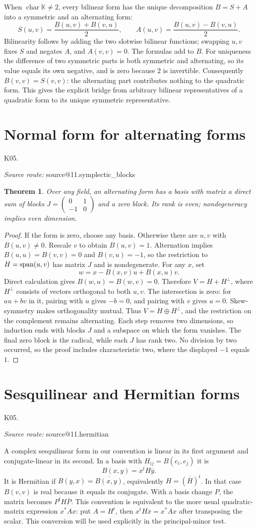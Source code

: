 \documentclass[11pt,a4paper]{book}
\makeatletter
\newtheorem{theorem}{Theorem}[chapter]
\theoremstyle{definition}\newtheorem{definition}[theorem]{Definition}
\theoremstyle{remark}\newtheorem{remark}[theorem]{Remark}
\newcommand{\K}{\mathbb K}\newcommand{\R}{\mathbb R}\newcommand{\C}{\mathbb C}
\newcommand{\Kentry}[2]{\section{#2}\label{k:#1}\noindent\textsf{\small K05.\detokenize{#1}}\par
  \begingroup\small\color{black!65}\textit{Source route: }\csname source@#1\endcsname\par\endgroup}
\makeatother
\begin{document}
When $\operatorname{char}\K\ne2$, every bilinear form has the unique decomposition $B=S+A$ into a symmetric and an alternating form:
\[S(u,v)=\frac{B(u,v)+B(v,u)}2,\qquad
A(u,v)=\frac{B(u,v)-B(v,u)}2.
\]
Bilinearity follows by adding the two slotwise bilinear functions; swapping $u,v$ fixes $S$ and negates $A$, and $A(v,v)=0$. The formulas add to $B$. For uniqueness the difference of two symmetric parts is both symmetric and alternating, so its value equals its own negative, and is zero because $2$ is invertible. Consequently $B(v,v)=S(v,v)$: the alternating part contributes nothing to the quadratic form. This gives the explicit bridge from arbitrary bilinear representatives of a quadratic form to its unique symmetric representative.

\Kentry{11.symplectic_blocks}{Normal form for alternating forms}
\begin{theorem}
Over any field, an alternating form has a basis with matrix a direct sum of blocks $J=\begin{pmatrix}0&1\\-1&0\end{pmatrix}$ and a zero block. Its rank is even; nondegeneracy implies even dimension.
\end{theorem}
\begin{proof}
If the form is zero, choose any basis. Otherwise there are $u,v$ with $B(u,v)\ne0$. Rescale $v$ to obtain $B(u,v)=1$. Alternation implies $B(u,u)=B(v,v)=0$ and $B(v,u)=-1$, so the restriction to $H=\operatorname{span}(u,v)$ has matrix $J$ and is nondegenerate. For any $x$, set
\[w=x-B(x,v)u+B(x,u)v.
\]
Direct calculation gives $B(w,u)=B(w,v)=0$. Therefore $V=H+H^\perp$, where $H^\perp$ consists of vectors orthogonal to both $u,v$. The intersection is zero: for $au+bv$ in it, pairing with $u$ gives $-b=0$, and pairing with $v$ gives $a=0$. Skew-symmetry makes orthogonality mutual. Thus $V=H\oplus H^\perp$, and the restriction on the complement remains alternating. Each step removes two dimensions, so induction ends with blocks $J$ and a subspace on which the form vanishes. The final zero block is the radical, while each $J$ has rank two. No division by two occurred, so the proof includes characteristic two, where the displayed $-1$ equals $1$.
\end{proof}

\Kentry{11.hermitian}{Sesquilinear and Hermitian forms}
A complex sesquilinear form in our convention is linear in its first argument and conjugate-linear in its second. In a basis with $H_{ij}=B(e_i,e_j)$ it is
\[B(x,y)=x^tH\overline y.
\]
It is Hermitian if $B(y,x)=\overline{B(x,y)}$, equivalently $H=(\overline H)^t$. In that case $B(v,v)$ is real because it equals its conjugate. With a basis change $P$, the matrix becomes $P^tH\overline P$. This convention is equivalent to the more usual quadratic-matrix expression $x^*Ax$: put $A=H^t$, then $x^tH\overline x=x^*Ax$ after transposing the scalar. This conversion will be used explicitly in the principal-minor test.
\end{document}
